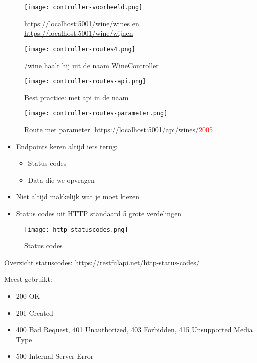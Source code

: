 \documentclass{article}
\begin{document}
\begin{figure}[H]
    \centering
    \texttt{[image: controller-voorbeeld.png]}
    \caption{\underline{https://localhost:5001/wine/wines} en \underline{https://localhost:5001/wine/wijnen}}
\end{figure}

\begin{figure}[H]
    \centering
    \texttt{[image: controller-routes4.png]}
    \caption{/wine haalt hij uit de naam WineController}
\end{figure}

\begin{figure}[H]
    \centering
    \texttt{[image: controller-routes-api.png]}
    \caption{Best practice: met api in de naam}
\end{figure}

\begin{figure}[H]
    \centering
    \texttt{[image: controller-routes-parameter.png]}
    \caption{Route met parameter. https://localhost:5001/api/wines/\textcolor{red}{2005}}
\end{figure}

\begin{itemize}
    \item Endpoints keren altijd iets terug:
    \begin{itemize}
        \item Status codes
        \item Data die we opvragen
    \end{itemize}
    \item Niet altijd makkelijk wat je moet kiezen
    \item Status codes uit HTTP standaard 5 grote verdelingen
\end{itemize}

\begin{figure}[H]
    \centering
    \texttt{[image: http-statuscodes.png]}
    \caption{Status codes}
\end{figure}

Overzicht statuscodes: \url{https://restfulapi.net/http-status-codes/}

Meest gebruikt: 

\begin{itemize}
    \item 200 OK
    \item 201 Created
    \item 400 Bad Request, 401 Unauthorized, 403 Forbidden, 415 Unsupported Media Type
    \item 500 Internal Server Error
\end{itemize}
\end{document}

